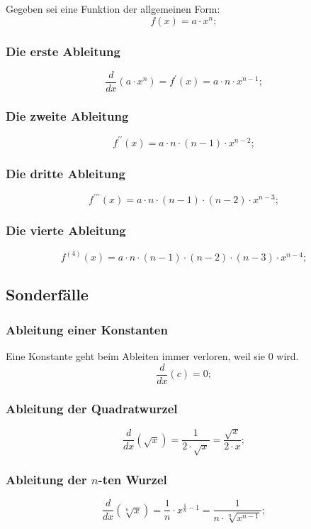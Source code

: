 \documentclass[a4paper]{article}
\begin{document}
Gegeben sei eine Funktion der allgemeinen Form:
\[
	 f(x) = a \cdot x^n ; 
\]

\subsubsection{Die erste Ableitung}
\[
	\frac{d}{dx} \left( a \cdot x^n \right) = f^\prime(x) = a \cdot n \cdot x^{n - 1} ;
\]

\subsubsection{Die zweite Ableitung}
\[
	f^{\prime\prime}(x) = a \cdot n \cdot \left( n - 1 \right) \cdot x^{n - 2} ;
\]

\subsubsection{Die dritte Ableitung}
\[
	f^{\prime\prime\prime}(x) = a \cdot n \cdot \left( n - 1 \right) \cdot \left( n - 2 \right) \cdot x^{n-3} ;
\]

\subsubsection{Die vierte Ableitung}
\[
	f^{(4)}(x) = a \cdot n \cdot \left( n - 1 \right) \cdot \left( n - 2 \right) \cdot \left( n - 3 \right) \cdot x^{n - 4} ;
\]

\subsection{Sonderf\"alle}

\subsubsection{Ableitung einer Konstanten}
Eine Konstante geht beim Ableiten immer verloren, weil sie $0$ wird.
\[
	\frac{d}{dx} \left( c \right) = 0 ;
\]

\subsubsection{Ableitung der Quadratwurzel}
\[
	\frac{d}{dx} \left( \sqrt{x} \right) = \frac{1}{2 \cdot \sqrt{x}} = \frac{\sqrt{x}}{2 \cdot x} ;
\]

\subsubsection{Ableitung der $n$-ten Wurzel}
\[
	\frac{d}{dx} \left( \sqrt[n]{x} \right) = \frac{1}{n} \cdot x^{\frac{1}{n} - 1} = \frac{1}{n \cdot \sqrt[n]{x^{n - 1}}} ;
\]
\end{document}
